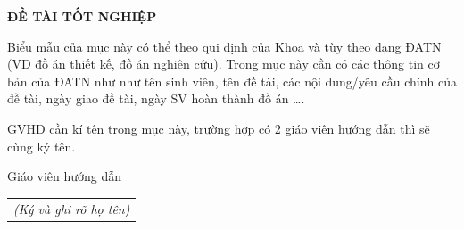 \documentclass[../DoAn.tex]{subfiles}
\begin{document}
	\begin{center}
		\Large{\textbf{ĐỀ TÀI TỐT NGHIỆP}}\\
	\end{center}
	\vspace{1cm}
	Biểu mẫu của mục này có thể theo qui định của Khoa và tùy theo dạng ĐATN (VD đồ án thiết kế, đồ án nghiên cứu). Trong mục này cần có các thông tin cơ bản của ĐATN như như tên sinh viên, tên đề tài, các nội dung/yêu cầu chính của đề tài, ngày giao đề tài, ngày SV hoàn thành đồ án …. 
	
	GVHD cần kí tên trong mục này, trường hợp có 2 giáo viên hướng dẫn thì sẽ cùng ký tên. 
	\begin{flushright}
		Giáo viên hướng dẫn\\
		\begin{tabular}{@{}c@{}}
			\textit{(Ký và ghi rõ họ tên)}
		\end{tabular}
	\end{flushright}
\end{document}
